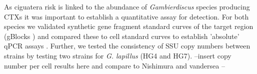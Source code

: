 \documentclass[12pt]{article}
\begin{document}
As ciguatera risk is linked to the abundance of \emph{Gambierdiscus} species producing CTXs it was important to establish a quantitative assay for detection.
For both species we validated synthetic gene fragment standard curves of the target region (gBlocks \textsuperscript{\textregistered}) and compared these to cell standard curves to establish 'absolute' qPCR assays \citep{nishimura2016quantitative,hariganeya2013quantitative}. Further, we tested the consistency of SSU copy numbers between strains by testing two strains for \emph{G. lapillus} (HG4 and HG7). %
--insert copy number per cell results here and compare to Nishimura and vandersea --\\ %
\end{document}
